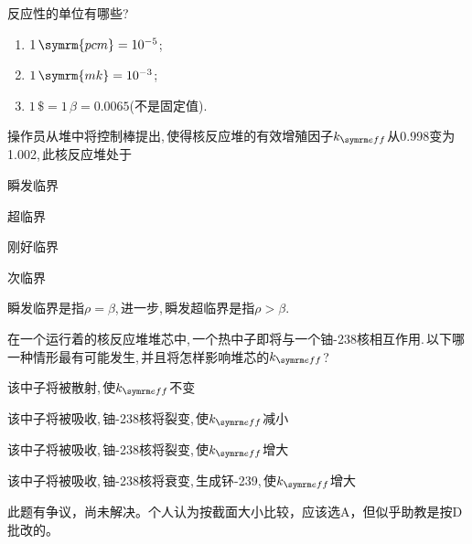 \begin{exercise}
    反应性的单位有哪些?
    \begin{solution}
        \begin{enumerate}[(1)]
            \item $1\,\symrm{pcm} = 10^{-5}$;
            \item $1\,\symrm{mk} = 10^{-3}$;
            \item $1\,\$ = 1\,\beta = 0.0065$(不是固定值).
        \end{enumerate}
    \end{solution}
\end{exercise}

\begin{exercise}
    操作员从堆中将控制棒提出,\,使得核反应堆的有效增殖因子$\keff$从0.998变为1.002,\,此核反应堆处于\xparen
    \begin{xchoices}[showanswer=true]
        \item 瞬发临界
        \item* 超临界
        \item 刚好临界
        \item 次临界
    \end{xchoices}
    \vspace{1em}
    \noindent {\color{third}{【注】}} {\kaishu 瞬发临界是指$\rho = \beta$,\,进一步,\,瞬发超临界是指$\rho > \beta$.}
\end{exercise}

\begin{exercise}
    在一个运行着的核反应堆堆芯中,\,一个热中子即将与一个铀-238核相互作用.\,以下哪一种情形最有可能发生,\,并且将怎样影响堆芯的$\keff$?\xparen
    \begin{xchoices}[showanswer=true]
        \item 该中子将被散射,\,使$\keff$不变
        \item 该中子将被吸收,\,铀-238核将裂变,\,使$\keff$减小
        \item 该中子将被吸收,\,铀-238核将裂变,\,使$\keff$增大
        \item* 该中子将被吸收,\,铀-238核将衰变,\,生成钚-239,\,使$\keff$增大
    \end{xchoices}
    \vspace{1em}
    \noindent {\color{third}{【注】}} {\kaishu 此题有争议，尚未解决。个人认为按截面大小比较，应该选A，但似乎助教是按D批改的。}
\end{exercise}

